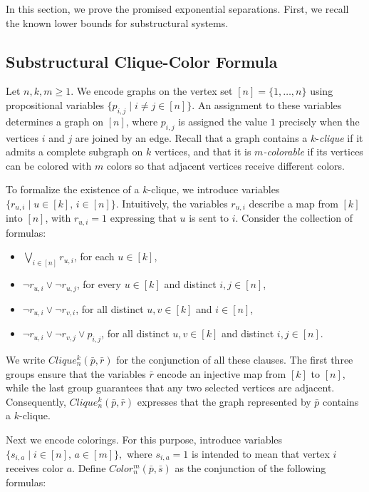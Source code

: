 \documentclass[12pt,a4paper]{article}
\theoremstyle{plain}
\theoremstyle{definition}
\begin{document}
In this section, we prove the promised exponential separations. First, we recall the known lower bounds for substructural systems.

\subsection{Substructural Clique-Color Formula}

Let $n,k,m\geq 1$. We encode graphs on the vertex set $[n]=\{1,\dots,n\}$ using propositional variables
$
\{p_{i,j}\mid i\neq j\in[n]\}.
$
An assignment to these variables determines a graph on $[n]$, where $p_{i,j}$ is assigned the value $1$ precisely when the vertices $i$ and $j$ are joined by an edge. Recall that a graph contains a $k$-\emph{clique} if it admits a complete subgraph on $k$ vertices, and that it is \emph{$m$-colorable} if its vertices can be colored with $m$ colors so that adjacent vertices receive different colors.

To formalize the existence of a $k$-clique, we introduce variables
$
\{r_{u,i}\mid u\in[k],\, i\in[n]\}.
$
Intuitively, the variables $r_{u,i}$ describe a map from $[k]$ into $[n]$, with $r_{u,i}=1$ expressing that $u$ is sent to $i$. Consider the collection of formulas:

\begin{itemize}
\item[$\bullet$]
$\displaystyle \bigvee_{i\in[n]} r_{u,i}$, for each $u\in[k]$,
\item[$\bullet$]
$\displaystyle \neg r_{u,i}\vee \neg r_{u,j}$, for every $u\in[k]$ and distinct $i,j\in[n]$,
\item[$\bullet$]
$\displaystyle \neg r_{u,i}\vee \neg r_{v,i}$, for all distinct $u,v\in[k]$ and $i\in[n]$,
\item[$\bullet$]
$\displaystyle \neg r_{u,i}\vee \neg r_{v,j}\vee p_{i,j}$, for all distinct $u,v\in[k]$ and distinct $i,j\in[n]$.
\end{itemize}
We write $Clique^k_n(\bar p,\bar r)$ for the conjunction of all these clauses. The first three groups ensure that the variables $\bar r$ encode an injective map from $[k]$ to $[n]$, while the last group guarantees that any two selected vertices are adjacent. Consequently, $Clique^k_n(\bar p,\bar r)$ expresses that the graph represented by $\bar p$ contains a $k$-clique. 

Next we encode colorings. For this purpose, introduce variables
$
\{s_{i,a}\mid i\in[n],\, a\in[m]\},
$
where $s_{i,a}=1$ is intended to mean that vertex $i$ receives color $a$. Define $Color^m_n(\bar p,\bar s)$ as the conjunction of the following formulas:
\end{document}
